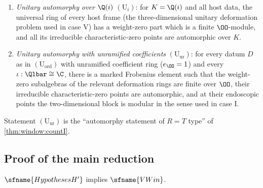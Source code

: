 \begin{definition}
\begin{enumerate}[label=(\arabic*)]
$2j+1$, and $W$ satisfies the window condition $\sfname{WitAQ}$ of \cref{def:window:kato}.
\item\label{pf:vwin-he:Ui} \emph{Unitary automorphy over $\Q(i)$} $(\mathrm{U}_{i})$: for $K=\Q(i)$ and all host
data, the universal ring of every host frame (the three-dimensional unitary deformation problem used in case V)
has a weight-zero part which is a finite $\OO$-module, and all its irreducible characteristic-zero points are
automorphic over $K$.
\item\label{pf:vwin-he:Uu} \emph{Unitary automorphy with unramified coefficients} $(\mathrm{U}_{\mathrm{ur}})$: for
every datum $D$ as in $(\mathrm{U}_{\mathrm{ord}})$ with unramified coefficient ring ($e_\OO=1$) and every
$\iota:\Qlbar\cong\C$, there is a marked Frobenius element such that the weight-zero subalgebras of the relevant
deformation rings are finite over $\OO$, their irreducible characteristic-zero points are automorphic, and at their
endoscopic points the two-dimensional block is modular in the sense used in case I.
\end{enumerate}
\end{definition}

Statement $(\mathrm{U}_{\mathrm{ur}})$ is the ``automorphy statement of $R=T$ type'' of \cref{thm:window:countI}.

\subsection{Proof of the main reduction}\label{sec:pf:vwin-he:proof}

\begin{theorem}\label{pf:vwin-he:main}
$\sfname{HypothesesH'}$ implies $\sfname{VWin}$.
\end{theorem}

